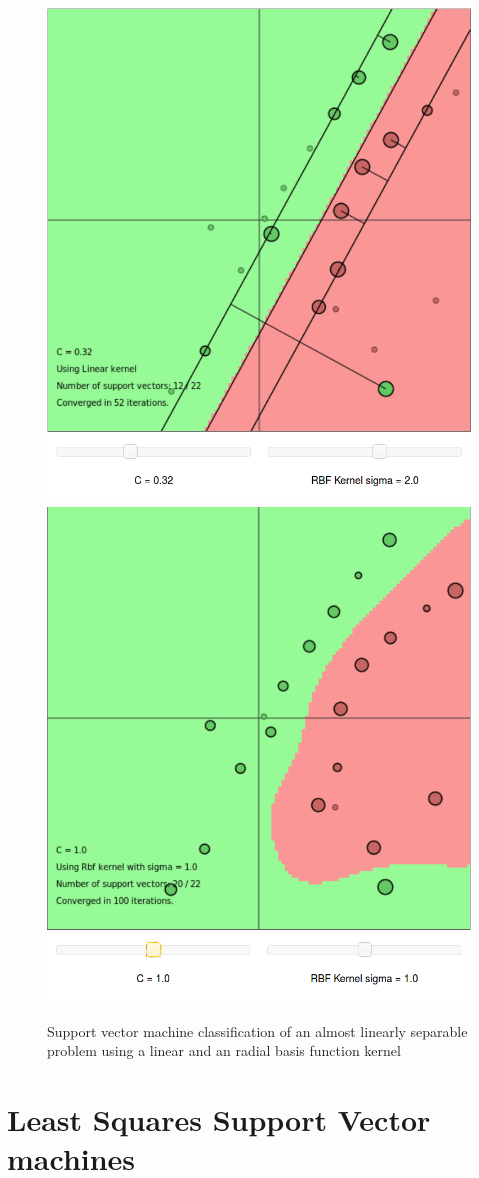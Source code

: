 \begin{figure}
\centering
\includegraphics[width=0.33\linewidth]{../src/figure/svmjsLinSep}
\includegraphics[width=0.33\linewidth]{../src/figure/svmjsLinRBF}
\caption{Support vector machine classification of an almost linearly separable problem using a linear and an radial basis function kernel}
\label{fig:svmjsLinRBF}
\end{figure}


\section{Least Squares Support Vector machines}